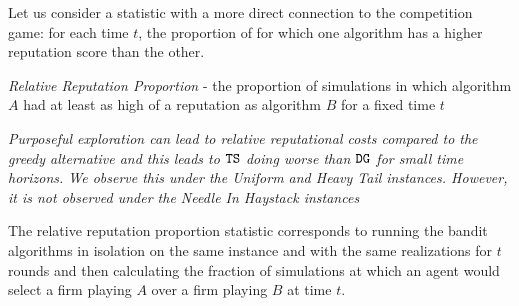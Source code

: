 \documentclass[../competing_bandits.tex]{subfiles}
\begin{document}
Let us consider a statistic with a more direct connection to the competition game: for each time $t$, the proportion of \MRVs for which one algorithm has a higher reputation score than the other. 

\begin{definition}
\textit{Relative Reputation Proportion} - the proportion of simulations in which algorithm $A$ had at least as high of a reputation as algorithm $B$ for a fixed time $t$
\end{definition}


\begin{finding}
\textit{Purposeful exploration can lead to relative reputational costs compared to the greedy alternative and this leads to $\mathtt{TS}$ doing worse than $\mathtt{DG}$ for small time horizons. We observe this under the Uniform and Heavy Tail instances. However, it is not observed under the Needle In Haystack instances}
\end{finding}

The relative reputation proportion statistic corresponds to running the bandit algorithms in isolation on the same instance and with the same realizations for $t$ rounds and then calculating the fraction of simulations at which an agent would select a firm playing $A$ over a firm playing $B$ at time $t$.
\end{document}
